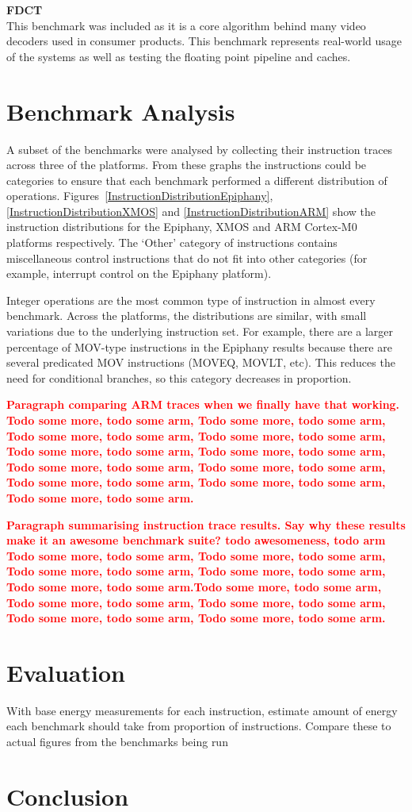 \documentclass[twocolumn]{article}
\newcommand{\nsection}[1]{\section{\bfseries #1}}
\newcommand{\todo}[1]{\textbf{\textcolor{red}{#1}}}
\begin{document}
\vspace{3mm}
\textbf{FDCT}\\
This benchmark was included as it is a core algorithm behind many video decoders used in consumer products. This benchmark represents real-world usage of the systems as well as testing the floating point pipeline and caches.


\nsection{Benchmark Analysis}

A subset of the benchmarks were analysed by collecting their instruction traces across three of the platforms. From these graphs the instructions could be categories to ensure that each benchmark performed a different distribution of operations. Figures~\ref{InstructionDistributionEpiphany}, \ref{InstructionDistributionXMOS} and \ref{InstructionDistributionARM} show the instruction distributions for the Epiphany, XMOS and ARM Cortex-M0 platforms respectively. The `Other' category of instructions contains miscellaneous control instructions that do not fit into other categories (for example, interrupt control on the Epiphany platform).

Integer operations are the most common type of instruction in almost every benchmark. Across the platforms, the distributions are similar, with small variations due to the underlying instruction set. For example, there are a larger percentage of MOV-type instructions in the Epiphany results because there are several predicated MOV instructions (MOVEQ, MOVLT, etc). This reduces the need for conditional branches, so this category decreases in proportion.

\todo{Paragraph comparing ARM traces when we finally have that working. Todo some more, todo some arm,  Todo some more, todo some arm,  Todo some more, todo some arm,  Todo some more, todo some arm,  Todo some more, todo some arm,  Todo some more, todo some arm,  Todo some more, todo some arm,  Todo some more, todo some arm,  Todo some more, todo some arm,  Todo some more, todo some arm,  Todo some more, todo some arm.}

\todo{Paragraph summarising instruction trace results. Say why these results make it an awesome benchmark suite? todo awesomeness, todo arm Todo some more, todo some arm,  Todo some more, todo some arm,  Todo some more, todo some arm,  Todo some more, todo some arm,  Todo some more, todo some arm.Todo some more, todo some arm,  Todo some more, todo some arm,  Todo some more, todo some arm,  Todo some more, todo some arm,  Todo some more, todo some arm.}

\nsection{Evaluation}

With base energy measurements for each instruction, estimate amount of energy each benchmark should take from proportion of instructions. Compare these to actual figures from the benchmarks being run

\nsection{Conclusion}

\printbibliography
\end{document}
